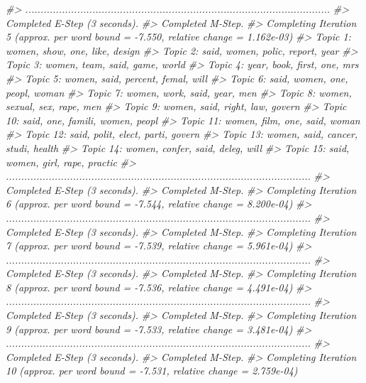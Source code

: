 \documentclass[]{book}
\newenvironment{Shaded}{\begin{snugshade}}{\end{snugshade}}
\newcommand{\CommentTok}[1]{\textcolor[rgb]{0.56,0.35,0.01}{\textit{#1}}}
\begin{document}
\begin{Shaded}
\begin{Highlighting}[]
\CommentTok{#> ....................................................................................................}
\CommentTok{#> Completed E-Step (3 seconds). }
\CommentTok{#> Completed M-Step. }
\CommentTok{#> Completing Iteration 5 (approx. per word bound = -7.550, relative change = 1.162e-03) }
\CommentTok{#> Topic 1: women, show, one, like, design }
\CommentTok{#>  Topic 2: said, women, polic, report, year }
\CommentTok{#>  Topic 3: women, team, said, game, world }
\CommentTok{#>  Topic 4: year, book, first, one, mrs }
\CommentTok{#>  Topic 5: women, said, percent, femal, will }
\CommentTok{#>  Topic 6: said, women, one, peopl, woman }
\CommentTok{#>  Topic 7: women, work, said, year, men }
\CommentTok{#>  Topic 8: women, sexual, sex, rape, men }
\CommentTok{#>  Topic 9: women, said, right, law, govern }
\CommentTok{#>  Topic 10: said, one, famili, women, peopl }
\CommentTok{#>  Topic 11: women, film, one, said, woman }
\CommentTok{#>  Topic 12: said, polit, elect, parti, govern }
\CommentTok{#>  Topic 13: women, said, cancer, studi, health }
\CommentTok{#>  Topic 14: women, confer, said, deleg, will }
\CommentTok{#>  Topic 15: said, women, girl, rape, practic }
\CommentTok{#> ....................................................................................................}
\CommentTok{#> Completed E-Step (3 seconds). }
\CommentTok{#> Completed M-Step. }
\CommentTok{#> Completing Iteration 6 (approx. per word bound = -7.544, relative change = 8.200e-04) }
\CommentTok{#> ....................................................................................................}
\CommentTok{#> Completed E-Step (3 seconds). }
\CommentTok{#> Completed M-Step. }
\CommentTok{#> Completing Iteration 7 (approx. per word bound = -7.539, relative change = 5.961e-04) }
\CommentTok{#> ....................................................................................................}
\CommentTok{#> Completed E-Step (3 seconds). }
\CommentTok{#> Completed M-Step. }
\CommentTok{#> Completing Iteration 8 (approx. per word bound = -7.536, relative change = 4.491e-04) }
\CommentTok{#> ....................................................................................................}
\CommentTok{#> Completed E-Step (3 seconds). }
\CommentTok{#> Completed M-Step. }
\CommentTok{#> Completing Iteration 9 (approx. per word bound = -7.533, relative change = 3.481e-04) }
\CommentTok{#> ....................................................................................................}
\CommentTok{#> Completed E-Step (3 seconds). }
\CommentTok{#> Completed M-Step. }
\CommentTok{#> Completing Iteration 10 (approx. per word bound = -7.531, relative change = 2.759e-04) }

\end{Highlighting}
\end{Shaded}
\end{document}

